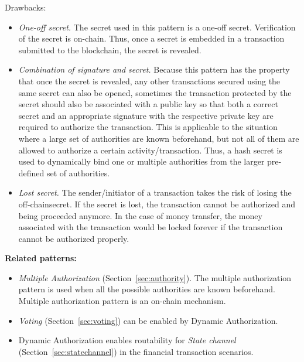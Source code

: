 Drawbacks: 
\begin{itemize}
    \item \textit{One-off secret.} The secret used in this pattern is a one-off secret. Verification of the secret is on-chain. Thus, once a secret is embedded in a transaction submitted to the blockchain, the secret is revealed. 
    \item \textit{Combination of signature and secret.} Because this pattern has the property that once the secret is revealed, any other transactions secured using the same secret can also be opened, sometimes the transaction protected by the secret should also be associated with a public key so that both a correct secret and an appropriate signature with the respective private key are required to authorize the transaction. This is applicable to the situation where a large set of authorities are known beforehand, but not all of them are allowed to authorize a certain activity/transaction. Thus, a hash secret is used to dynamically bind one or multiple authorities from the larger pre-defined set of authorities.  
    \item \textit{Lost secret.} The sender/initiator of a transaction takes the risk of losing the off-chainsecret. If the secret is lost, the transaction cannot be authorized and being proceeded anymore. In the case of money transfer, the money associated with the transaction would be locked forever if the transaction cannot be authorized properly.
\end{itemize}


\vspace{0.5em}\noindent \textbf{Related patterns:}
\begin{itemize}
    \item \textit{Multiple Authorization} (Section~\ref{sec:authority}). The multiple authorization pattern is used when all the possible authorities are known beforehand. Multiple authorization pattern is an on-chain mechanism.  
    \item \textit{Voting} (Section~\ref{sec:voting}) can be enabled by Dynamic Authorization.
    \item Dynamic Authorization enables routability for \textit{State channel} (Section~\ref{sec:statechannel}) in the financial transaction scenarios.
    
\end{itemize}


